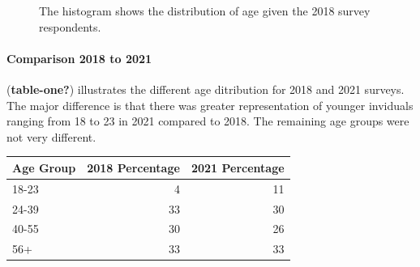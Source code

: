 \documentclass[
  letterpaper,
  DIV=11,
  numbers=noendperiod]{scrartcl}
\let\oldparagraph\paragraph
\renewcommand{\paragraph}[1]{\oldparagraph{#1}\mbox{}}
\begin{document}
\begin{figure}


\caption{\label{fig-one}The histogram shows the distribution of age
given the 2018 survey respondents.}

\end{figure}%

\paragraph{Comparison 2018 to 2021}\label{comparison-2018-to-2021}

(\textbf{table-one?}) illustrates the different age ditribution for 2018
and 2021 surveys. The major difference is that there was greater
representation of younger inviduals ranging from 18 to 23 in 2021
compared to 2018. The remaining age groups were not very different.

\begin{table}
\centering
\begin{tabular}[t]{l|r|r}
\hline
Age Group & 2018 Percentage & 2021 Percentage\\
\hline
18-23 & 4 & 11\\
\hline
24-39 & 33 & 30\\
\hline
40-55 & 30 & 26\\
\hline
56+ & 33 & 33\\
\hline
\end{tabular}
\end{table}
\end{document}
